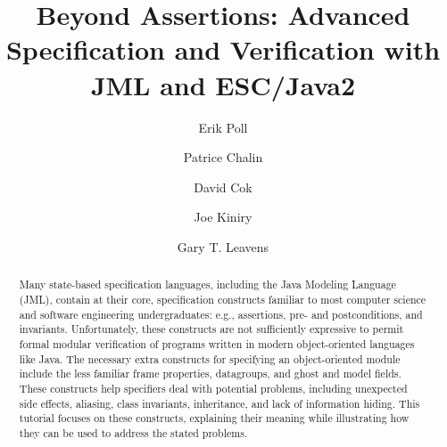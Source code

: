 \documentclass{llncs}
\begin{document}
\title{Beyond Assertions: 
       Advanced Specification and Verification with JML and ESC/Java2}

\author{Erik Poll
        \and Patrice Chalin
        \and David Cok
        \and Joe Kiniry
        \and Gary T. Leavens 
       }



%
\newcommand{\GMARGIN}[1]{\marginpar{\textcolor{blue}{\sf\scriptsize #1}}}
\newcommand{\MARGIN}[1]{\marginpar{\sf\scriptsize #1}}
\newcommand{\COMMENT}[1]{{\sf\scriptsize  #1}}

\newcommand{\figref}[1]{\figurename~\ref{#1}}
\newcommand{\secref}[1]{Section~\ref{#1}}

\maketitle

\begin{abstract}
Many state-based specification languages, including the Java Modeling Language
(JML), contain at their core, specification constructs familiar to most
computer science and software engineering undergraduates: e.g., assertions,
pre- and postconditions, and invariants.  Unfortunately, these constructs are
not sufficiently expressive to permit formal modular verification of programs
written in modern object-oriented languages like Java. The necessary extra
constructs for specifying an object-oriented module include the less familiar
frame properties, datagroups, and ghost and model fields.  These constructs
help specifiers deal with potential problems, including unexpected side
effects, aliasing, class invariants, inheritance, and lack of information
hiding.
%
This tutorial focuses on these constructs, explaining their meaning while
illustrating how they can be used to address the stated problems.
\end{abstract}
\end{document}
